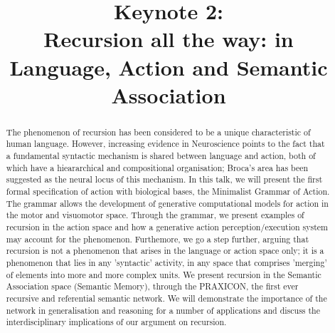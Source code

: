 \documentclass{article}
\title{Keynote 2:\\Recursion all the way: in Language, Action and Semantic Association}
\begin{document}
\maketitle
\thispagestyle{empty}
\begin{abstract}
The phenomenon of recursion has been considered to be a unique characteristic of human language. However, increasing evidence in Neuroscience points to the fact that a fundamental syntactic mechanism is shared between language and action, both of which have a hieararchical and compositional organisation; Broca's area has been suggested as the neural locus of this mechanism.  In this talk, we will present the first formal specification of action with biological bases, the Minimalist Grammar of Action. The grammar allows the development of  generative computational models for action in the motor and visuomotor space. Through the grammar, we present examples of recursion in the action space and how a generative action perception/execution system may account for the phenomenon. Furthemore, we go a step further, arguing that recursion is not a phenomenon that arises in the language or action space only; it is a phenomenon that lies in any 'syntactic' activity, in any space that comprises 'merging' of elements into more and more complex units. We present recursion in the Semantic Association space (Semantic Memory), through the PRAXICON, the first ever recursive and referential semantic network. We will demonstrate the importance of the network in generalisation and reasoning for a number of applications and discuss the interdisciplinary implications of our argument on recursion. 
\end{abstract}
\vfill{}
\end{document}
